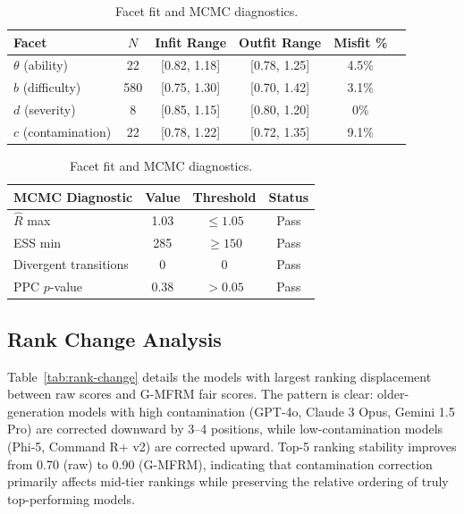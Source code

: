 \documentclass[11pt]{article}
\newcommand{\gmfrm}{\textsc{G-MFRM}}
\begin{document}
\begin{table}[t]
\centering
\caption{Facet fit and MCMC diagnostics.}
\label{tab:fit-diagnostics}
\small
\begin{tabular}{@{}lccccc@{}}
\toprule
Facet & $N$ & Infit Range & Outfit Range & Misfit \% \\
\midrule
$\theta$ (ability) & 22 & [0.82, 1.18] & [0.78, 1.25] & 4.5\% \\
$b$ (difficulty) & 580 & [0.75, 1.30] & [0.70, 1.42] & 3.1\% \\
$d$ (severity) & 8 & [0.85, 1.15] & [0.80, 1.20] & 0\% \\
$c$ (contamination) & 22 & [0.78, 1.22] & [0.72, 1.35] & 9.1\% \\
\bottomrule
\end{tabular}
\vspace{4pt}
\small
\begin{tabular}{@{}lccc@{}}
\toprule
MCMC Diagnostic & Value & Threshold & Status \\
\midrule
$\hat{R}$ max & 1.03 & $\leq 1.05$ & Pass \\
ESS min & 285 & $\geq 150$ & Pass \\
Divergent transitions & 0 & 0 & Pass \\
PPC $p$-value & 0.38 & $> 0.05$ & Pass \\
\bottomrule
\end{tabular}
\end{table}

\subsection{Rank Change Analysis}

Table~\ref{tab:rank-change} details the models with largest ranking displacement between raw scores and \gmfrm{} fair scores. The pattern is clear: older-generation models with high contamination (GPT-4o, Claude 3 Opus, Gemini 1.5 Pro) are corrected downward by 3--4 positions, while low-contamination models (Phi-5, Command R+ v2) are corrected upward. Top-5 ranking stability improves from 0.70 (raw) to 0.90 (\gmfrm{}), indicating that contamination correction primarily affects mid-tier rankings while preserving the relative ordering of truly top-performing models.
\end{document}
